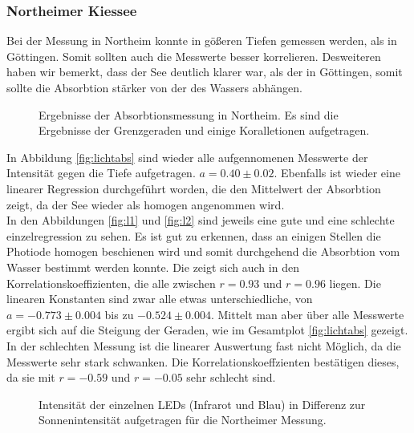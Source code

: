 \documentclass[12pt,a4paper,titlepage,headinclude,bibtotoc]{scrartcl}
\numberwithin{equation}{subsection}
\begin{document}
\subsubsection{Northeimer Kiessee}
Bei der Messung in Northeim konnte in gößeren Tiefen gemessen werden, als in Göttingen.
Somit sollten auch die Messwerte besser korrelieren.
Desweiteren haben wir bemerkt, dass der See deutlich klarer war, als der in Göttingen, somit sollte die Absorbtion stärker von der des Wassers abhängen.
\begin{figure}[!h]
	\centering
   \hfill
   \hfill
   \hfill
	\caption{Ergebnisse der Absorbtionsmessung in Northeim. Es sind die Ergebnisse der Grenzgeraden und einige Koralletionen aufgetragen.}
	\label{fig:lichtNort}
\end{figure}
In Abbildung \ref{fig:lichtabs} sind wieder alle aufgennomenen Messwerte der Intensität gegen die Tiefe aufgetragen.
$a=0.40\pm0.02$.
Ebenfalls ist wieder eine linearer Regression durchgeführt worden, die den Mittelwert der Absorbtion zeigt, da der See wieder als homogen angenommen wird.\\%
In den Abbildungen \ref{fig:l1} und \ref{fig:l2} sind jeweils eine gute und eine schlechte einzelregression zu sehen.
Es ist gut zu erkennen, dass an einigen Stellen die Photiode homogen beschienen wird und somit durchgehend die Absorbtion vom Wasser bestimmt werden konnte.
Die zeigt sich auch in den Korrelationskoeffizienten, die alle zwischen $r=0.93$ und $r=0.96$ liegen.
Die linearen Konstanten sind zwar alle etwas unterschiedliche, von $a=-0.773\pm0.004$ bis zu $-0.524\pm0.004$.
Mittelt man aber über alle Messwerte ergibt sich auf die Steigung der Geraden, wie im Gesamtplot \ref{fig:lichtabs} gezeigt.
In der schlechten Messung ist die linearer Auswertung fast nicht Möglich, da die Messwerte sehr stark schwanken.
Die Korrelationskoeffzienten bestätigen dieses, da sie mit $r=-0.59$ und $r=-0.05$ sehr schlecht sind.\\
\begin{figure}[!htb]
	\centering
	\resizebox{0.7\linewidth}{!}{}
	\caption{Intensität der einzelnen LEDs (Infrarot und Blau) in Differenz zur Sonnenintensität aufgetragen für die Northeimer Messung.}
	\label{fig:led}
\end{figure}
\end{document}
